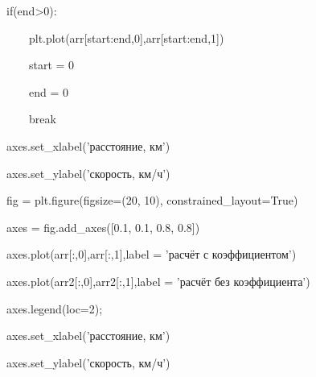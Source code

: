 \documentclass[A4paper,12pt]{article}
\theoremstyle{plain} %
\theoremstyle{definition} %
\theoremstyle{remark} %
\begin{document}
    if(end>0):
    
    \ \ \ \ plt.plot(arr[start:end,0],arr[start:end,1])
    
    \ \ \ \ start = 0
    
    \ \ \ \ end = 0
    
    \ \ \ \ break
    
\noindent axes.set\_xlabel('расстояние, км')

\noindent axes.set\_ylabel('скорость, км/ч')

\noindent fig = plt.figure(figsize=(20, 10), constrained\_layout=True)

\noindent axes = fig.add\_axes([0.1, 0.1, 0.8, 0.8])

\noindent axes.plot(arr[:,0],arr[:,1],label = 'расчёт с коэффициентом')

\noindent axes.plot(arr2[:,0],arr2[:,1],label = 'расчёт без коэффициента')

\noindent axes.legend(loc=2);

\noindent axes.set\_xlabel('расстояние, км')

\noindent axes.set\_ylabel('скорость, км/ч')
\end{document}
